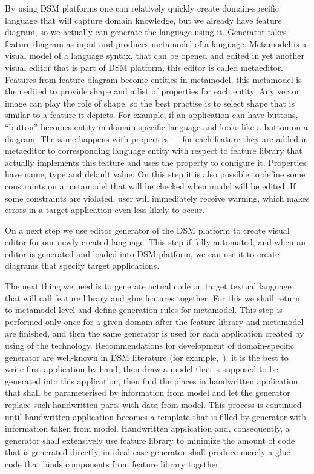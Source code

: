 \documentclass[conference]{IEEEtran}
\begin{document}
By using DSM platforms one can relatively quickly create domain-specific language that will capture domain knowledge, but we already have feature diagram, so we actually can generate the language using it. Generator takes feature diagram as input and produces metamodel of a language. Metamodel is a visual model of a language syntax, that can be opened and edited in yet another visual editor that is part of DSM platform, this editor is called metaeditor. Features from feature diagram become entities in metamodel, this metamodel is then edited to provide shape and a list of properties for each entity. Any vector image can play the role of shape, so the best practise is to select shape that is similar to a feature it depicts. For example, if an application can have buttons, “button” becomes entity in domain-specific language and looks like a button on a diagram. The same happens with properties --- for each feature they are added in metaeditor to corresponding language entity with respect to feature library that actually implements this feature and uses the property to configure it. Properties have name, type and default value. On this step it is also possible to define some constraints on a metamodel that will be checked when model will be edited. If some constraints are violated, user will immediately receive warning, which makes errors in a target application even less likely to occur.

On a next step we use editor generator of the DSM platform to create visual editor for our newly created language. This step if fully automated, and when an editor is generated and loaded into DSM platform, we can use it to create diagrams that specify target applications.

The next thing we need is to generate actual code on target textual language that will call feature library and glue features together. For this we shall return to metamodel level and define generation rules for metamodel. This step is performed only once for a given domain after the feature library and metamodel are finished, and then the same generator is used for each application created by using of the technology. Recommendations for development of domain-specific generator are well-known in DSM literature (for example,~\cite{kelly2008domain}): it is the best to write first application by hand, then draw a model that is supposed to be generated into this application, then find the places in handwritten application that shall be parameterised by information from model and let the generator replace such handwritten parts with data from model. This process is continued until handwritten application becomes a template that is filled by generator with information taken from model. Handwritten application and, consequently, a generator shall extensively use feature library to minimize the amount of code that is generated directly, in ideal case generator shall produce merely a glue code that binds components from feature library together.
\end{document}
